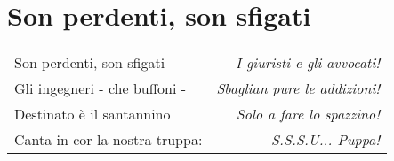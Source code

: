 \section{Son perdenti, son sfigati}
{\normalfont
\begin{tabular}{l r}
	Son perdenti, son sfigati & \textit{I giuristi e gli avvocati!} \\
	Gli ingegneri - che buffoni - & \textit{Sbaglian pure le addizioni!} \\
	Destinato è il santannino & \textit{Solo a fare lo spazzino!} \\
	Canta in cor la nostra truppa: & \textit{S.S.S.U... Puppa!}
\end{tabular}
}